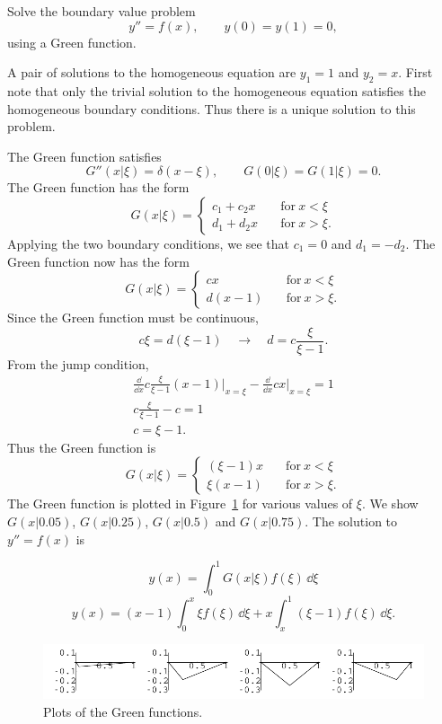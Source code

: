 \begin{Example} \label{greens_fx}
  Solve the boundary value problem
  \[y'' = f(x), \qquad y(0) = y(1) = 0,\]
  using a Green function.

  A pair of solutions to the homogeneous equation are $y_1 = 1$ and $y_2 = x$.
  First note that only the trivial solution to the homogeneous equation
  satisfies the homogeneous boundary conditions.  Thus there is a unique solution
  to this problem.

  The Green function satisfies 
  \[ G''(x|\xi) = \delta(x-\xi), \qquad G(0|\xi) = G(1|\xi) = 0.\]
  The Green function has the form
  \[ G(x|\xi) = 
  \begin{cases}
    c_1 + c_2 x \quad &\mathrm{for}\ x < \xi \\
    d_1 + d_2 x \quad &\mathrm{for}\  x > \xi.
  \end{cases}
  \]
  Applying the two boundary conditions, we see that $c_1 = 0$ and $d_1=-d_2$.
  The Green function now has the form
  \[ G(x|\xi) = 
  \begin{cases}
    c x \quad &\mathrm{for}\  x < \xi \\
    d(x-1) \quad &\mathrm{for}\  x > \xi.
  \end{cases}
  \]
  Since the Green function must be continuous,
  \[ c \xi = d(\xi-1) \quad \to \quad d = c \frac{\xi}{\xi-1}.\]
  From the jump condition,
  \begin{gather*}
    \frac{\dd}{\dd x} c \frac{\xi}{\xi-1} (x-1) \Big|_{x=\xi} 
    - \frac{\dd}{\dd x} c x \Big|_{x=\xi} = 1 \\
    c \frac{\xi}{\xi-1} - c = 1 \\
    c = \xi-1.
  \end{gather*}
  Thus the Green function is
  \[ \boxed{ G(x|\xi) = 
    \begin{cases}
      (\xi-1) x \quad &\mathrm{for}\ x < \xi \\
      \xi(x-1) \quad &\mathrm{for}\ x > \xi.
    \end{cases} }
  \]
  The Green function is plotted in Figure~\ref{greens_x} for various values
  of $\xi$.  We show $G(x|0.05)$, $G(x|0.25)$, $G(x|0.5)$ and $G(x|0.75)$.
  The solution to $y'' = f(x)$ is

  \[ y(x) = \int_0^1 G(x|\xi) f(\xi)\,\dd \xi \]
  \[ \boxed{ y(x) = (x-1) \int_0^x \xi f(\xi)\,\dd \xi 
    + x \int_x^1 (\xi - 1) f(\xi)\,\dd \xi. } \]

  \begin{figure}[tb!]
    \begin{center}
      \includegraphics[width=\textwidth]{ode/inhomogeneous/greensx}
    \end{center}
    \caption{Plots of the Green functions.} 
    \label{greens_x}
  \end{figure}

\end{Example}
